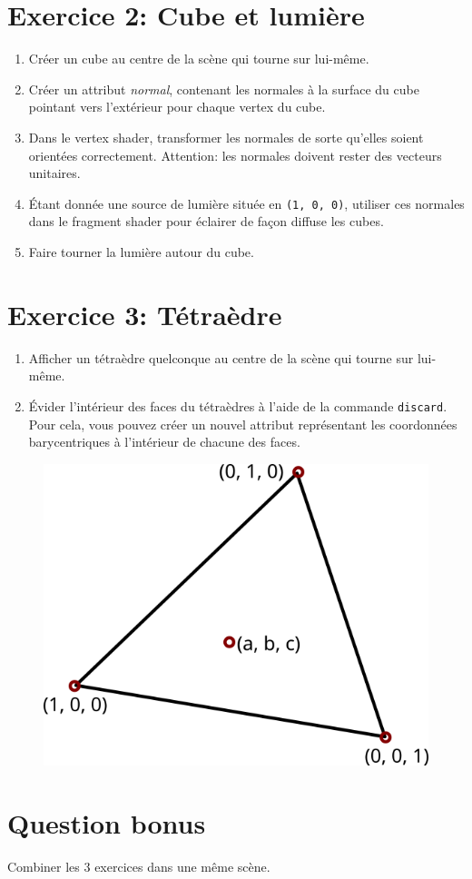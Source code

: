 \documentclass{article}
\begin{document}
\section*{Exercice 2: Cube et lumi\`ere}
\begin{enumerate}
\item Cr\'eer un cube au centre de la sc\`ene qui tourne sur lui-m\^eme.
\item Cr\'eer un attribut \emph{normal}, contenant les normales à la surface du cube pointant vers l'extérieur pour chaque vertex du cube.
\item Dans le vertex shader, transformer les normales de sorte qu'elles soient orient\'ees correctement.
  Attention: les normales doivent rester des vecteurs unitaires.
\item \'Etant donn\'ee une source de lumi\`ere situ\'ee en \texttt{(1, 0, 0)}, utiliser ces normales dans le fragment shader pour \'eclairer de fa\c con diffuse les cubes.
\item Faire tourner la lumi\`ere autour du cube.
\end{enumerate}


\section*{Exercice 3: T\'etra\`edre}

\begin{enumerate}
\item Afficher un t\'etra\`edre quelconque au centre de la sc\`ene qui tourne sur lui-m\^eme.
\item \'Evider l'int\'erieur des faces du t\'etra\`edres \`a l'aide de la commande \texttt{discard}. Pour cela, vous pouvez cr\'eer un nouvel attribut représentant les coordonn\'ees barycentriques à l'intérieur de chacune des faces. 
\end{enumerate}

\begin{figure}[h]
  \centering
  \includegraphics[width=0.3\linewidth]{barycentres}
\end{figure}

\section{Question bonus}

Combiner les 3 exercices dans une m\^eme sc\`ene.
\end{document}

